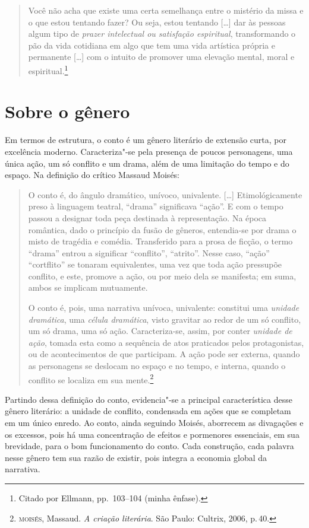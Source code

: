 \begin{quote}
Você não acha que existe uma certa semelhança entre o mistério da missa e o que
estou tentando fazer? Ou seja, estou tentando [\ldots{}] dar às pessoas algum tipo
de \textit{prazer intelectual ou satisfação espiritual}, transformando o pão da
vida cotidiana em algo que tem uma vida artística própria e permanente [\ldots{}]
com o intuito de promover uma elevação mental, moral e
espiritual.\footnote{ Citado por Ellmann, pp.~103--104 (minha ênfase).}
\end{quote}

\section{Sobre o gênero}

Em termos de estrutura, o conto é um gênero literário de extensão curta, por excelência moderno. Caracteriza"-se pela
presença de poucos personagens, uma única ação, um só conflito e um
drama, além de uma limitação do tempo e do espaço.
Na definição do crítico Massaud Moisés:

\begin{quote}
O conto é, do ângulo dramático, unívoco, univalente. [\ldots]
Etimológicamente preso à linguagem teatral,
``drama'' significava ``ação''. E com o tempo passou a designar
toda peça destinada à representação. Na época romântica, dado o
princípio da fusão de gêneros, entendia-se por drama o misto de
tragédia e comédia. Transferido para a prosa de ficção, o termo
``drama'' entrou a significar ``conflito'', ``atrito''. Nesse caso,
``ação'' ``cortflito'' se tonaram equivalentes, uma vez que toda
ação pressupõe conflito, e este, promove a ação, ou por meio dela
se manifesta; em suma, ambos se implicam mutuamente.

O conto é, pois, uma narrativa unívoca, univalente: constitui
uma \textit{unidade dramática}, uma \textit{célula dramática}, visto gravitar ao
redor de um só conflito, um só drama, uma só ação. Caracteriza-se,
assim, por conter \textit{unidade de ação}, tomada esta como a sequência de atos praticados pelos protagonistas, ou de acontecimentos de
que participam. A ação pode ser externa, quando as personagens se
deslocam no espaço e no tempo, e interna, quando o conflito se
localiza em sua mente.\footnote{\textsc{moisés}, Massaud. \textit{A criação literária}. São Paulo: Cultrix, 2006, p.\,40.}
\end{quote}

Partindo dessa definição do conto, evidencia"-se a principal característica desse gênero literário: a unidade de conflito, condensada em ações que se completam em um único enredo. Ao conto, ainda seguindo Moisés, aborrecem as divagações e os excessos, pois há uma concentração de efeitos e pormenores essenciais, em sua brevidade, para o bom funcionamento do conto.
Cada construção, cada palavra nesse gênero tem sua razão de existir, pois integra a economia global da narrativa.

